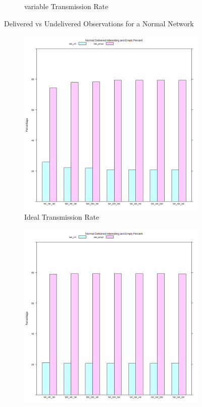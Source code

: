\begin{figure}[H]
\begin{subfigure}{.5\textwidth}
  \caption{variable Transmission Rate}
	\label{fig:sim:res:norm:variable:delundel}
\end{subfigure}
\caption{Delivered vs Undelivered Observations for a Normal Network}
\end{figure}

\begin{figure}[H]
\centering
\begin{subfigure}{.5\textwidth}
  \centering
\includegraphics[width=\textwidth]{Chap7/figures/plots/normal_variable/emptvsint_percent.png}
  \caption{Ideal Transmission Rate}
	\label{fig:sim:res:norm:ideal:emptint}
\end{subfigure}%
\begin{subfigure}{.5\textwidth}
  \centering
\includegraphics[width=\textwidth]{Chap7/figures/plots/normal_ideal/emptvsint_percent.png}

\end{subfigure}
\end{figure}
